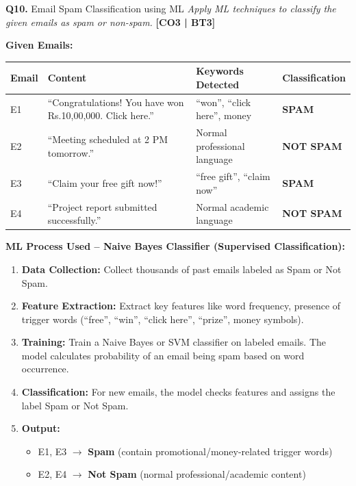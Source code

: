 \documentclass[12pt,a4paper]{article}
\newcommand{\Qno}[1]{\textbf{\color{darkred}Q#1.}}
\newcommand{\term}[1]{\textbf{\color{headingcolor}#1}}
\newcommand{\rupee}{\textrm{Rs.}}
\begin{document}
\vspace{8pt}

\begin{questionbox}{\Qno{10} Email Spam Classification using ML}
\textit{Apply ML techniques to classify the given emails as spam or non-spam.} \hfill \textbf{[CO3 | BT3]}
\end{questionbox}

\begin{answerenv}

\textbf{\color{headingcolor}Given Emails:}
\begin{center}
\begin{tabular}{ll p{6cm} l}
\toprule
\textbf{Email} & \textbf{Content} & \textbf{Keywords Detected} & \textbf{Classification} \\
\midrule
E1 & ``Congratulations! You have won \rupee10,00,000. Click here.'' & ``won'', ``click here'', money & \textbf{\color{darkred}SPAM} \\[4pt]
E2 & ``Meeting scheduled at 2 PM tomorrow.'' & Normal professional language & \textbf{\color{darkblue}NOT SPAM} \\[4pt]
E3 & ``Claim your free gift now!'' & ``free gift'', ``claim now'' & \textbf{\color{darkred}SPAM} \\[4pt]
E4 & ``Project report submitted successfully.'' & Normal academic language & \textbf{\color{darkblue}NOT SPAM} \\
\bottomrule
\end{tabular}
\end{center}

\textbf{\color{headingcolor}ML Process Used -- Naive Bayes Classifier (Supervised Classification):}

\begin{enumerate}[leftmargin=1.8em, itemsep=4pt]
  \item \term{Data Collection:} Collect thousands of past emails labeled as Spam or Not Spam.
  \item \term{Feature Extraction:} Extract key features like word frequency, presence of trigger words (``free'', ``win'', ``click here'', ``prize'', money symbols).
  \item \term{Training:} Train a Naive Bayes or SVM classifier on labeled emails. The model calculates probability of an email being spam based on word occurrence.
  \item \term{Classification:} For new emails, the model checks features and assigns the label Spam or Not Spam.
  \item \term{Output:}
    \begin{itemize}[leftmargin=1.5em]
      \item E1, E3 $\to$ \textbf{Spam} (contain promotional/money-related trigger words)
      \item E2, E4 $\to$ \textbf{Not Spam} (normal professional/academic content)
    \end{itemize}
\end{enumerate}


\end{answerenv}
\end{document}
